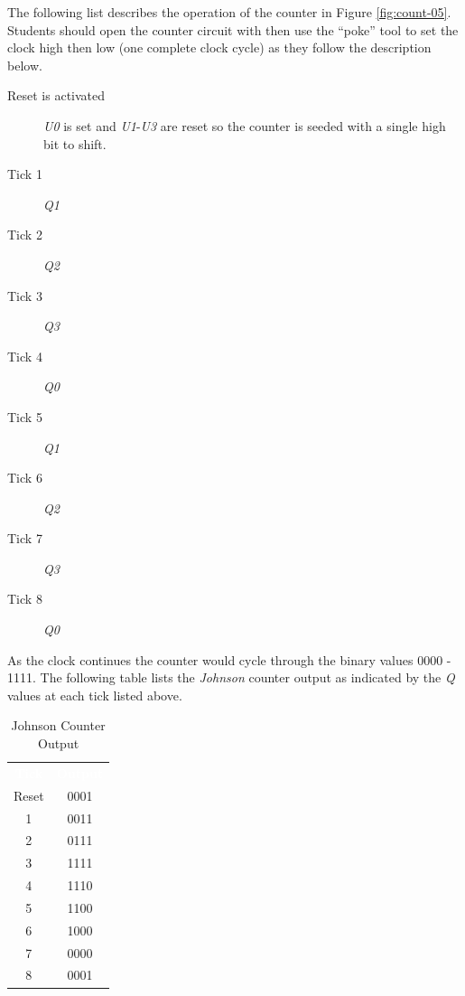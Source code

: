 The following list describes the operation of the counter in Figure \ref{fig:count-05}. Students should open the counter circuit with \LE then use the ``poke'' tool to set the clock high then low (one complete clock cycle) as they follow the description below.

\begin{description}
	\item [Reset is activated] \textit{U0} is set and \textit{U1}-\textit{U3} are reset so the counter is seeded with a single high bit to shift.
	
	\item [Tick 1] \textit{Q1} \textuparrow 
	
	\item [Tick 2] \textit{Q2} \textuparrow
	
	\item [Tick 3] \textit{Q3} \textuparrow 
	
	\item [Tick 4] \textit{Q0} \textdownarrow

	\item [Tick 5] \textit{Q1} \textdownarrow

	\item [Tick 6] \textit{Q2} \textdownarrow
	
	\item [Tick 7] \textit{Q3} \textdownarrow

	\item [Tick 8] \textit{Q0} \textuparrow

\end{description}

As the clock continues the counter would cycle through the binary values 0000 - 1111. The following table lists the \textit{Johnson} counter output as indicated by the \textit{Q} values at each tick listed above.

\begin{table}[H]
	\sffamily
	\newcommand{\head}[1]{\textcolor{white}{\textbf{#1}}}		
	\begin{center}
		\begin{tabular}{cc} 
			\rowcolor{black!75}
			\head{Tick} & \head{Output} \\
			Reset & 0001 \\
			1 & 0011 \\
			2 & 0111 \\
			3 & 1111 \\
			4 & 1110 \\
			5 & 1100 \\
			6 & 1000 \\
			7 & 0000 \\
			8 & 0001 
		\end{tabular}
	\end{center}
	\caption{Johnson Counter Output}
	\label{tab0605}
\end{table}

